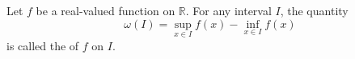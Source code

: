 Let $f$ be a real-valued function on $\mathbb{R}$. For any interval $I$, the quantity
$$\omega(I) = \sup_{x \in I} f(x) - \inf_{x \in I} f(x)$$
is called the  of $f$ on $I$.
